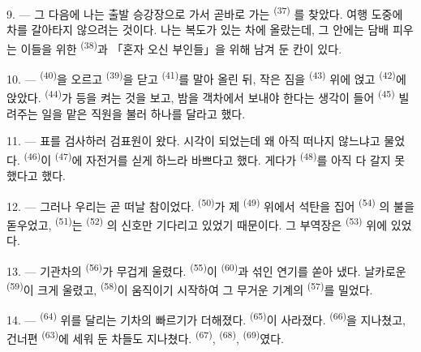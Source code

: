 9. --- 그 다음에 나는 출발 승강장으로 가서 곧바로 가는  \textsuperscript{(37)}
를 찾았다. 여행 도중에 차를 갈아타지 않으려는 것이다. 나는 복도가 있는 차에 올랐는데,
그 안에는 담배 피우는 이들을 위한  \textsuperscript{(38)}과 「혼자 오신
부인들」을 위해 남겨 둔 칸이 있다.

\VUsaut{3.0mm}

10. ---  \textsuperscript{(40)}을 오르고  \textsuperscript{(39)}을
닫고  \textsuperscript{(41)}를 말아 올린 뒤, 작은 짐을 
\textsuperscript{(43)} 위에 얹고  \textsuperscript{(42)}에 앉았다.
 \textsuperscript{(44)}가 등을 켜는 것을 보고, 밤을 객차에서 보내야
한다는 생각이 들어  \textsuperscript{(45)} 빌려주는 일을 맡은 직원을 불러
하나를 달라고 했다.

11. --- 표를 검사하러 검표원이 왔다. 시각이 되었는데 왜 아직 떠나지 않느냐고 물었다.
 \textsuperscript{(46)}이  \textsuperscript{(47)}에 자전거를
싣게 하느라 바쁘다고 했다. 게다가  \textsuperscript{(48)}를 아직 다
갈지 못했다고 했다.

12. --- 그러나 우리는 곧 떠날 참이었다.  \textsuperscript{(50)}가 제
 \textsuperscript{(49)} 위에서 석탄을 집어  \textsuperscript{(54)}
의 불을 돋우었고,  \textsuperscript{(51)}는  \textsuperscript{(52)}
의 신호만 기다리고 있었기 때문이다. 그 부역장은  \textsuperscript{(53)} 위에
있었다.

13. --- 기관차의  \textsuperscript{(56)}가 무겁게 울렸다. 
\textsuperscript{(55)}이  \textsuperscript{(60)}과 섞인 연기를 쏟아 냈다.
날카로운  \textsuperscript{(59)}이 크게 울렸고, 
\textsuperscript{(58)}이 움직이기 시작하여 그 무거운 기계의 
\textsuperscript{(57)}를 밀었다.

\VUsaut{3.0mm}
\VUsaut{3.0mm}

14. ---  \textsuperscript{(64)} 위를 달리는 기차의 빠르기가 더해졌다.
 \textsuperscript{(65)}이 사라졌다.  \textsuperscript{(66)}을
지나쳤고, 건너편  \textsuperscript{(63)}에 세워 둔 차들도 지나쳤다.
 \textsuperscript{(67)},  \textsuperscript{(68)},
 \textsuperscript{(69)}였다.

